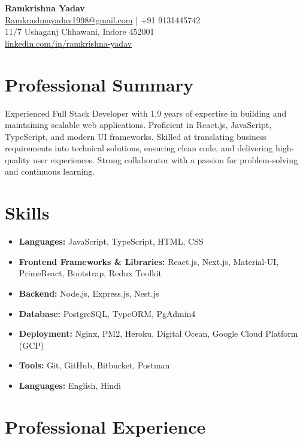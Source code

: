 \documentclass[a4paper,11pt]{article}
\begin{document}
\begin{center}
    \Huge \textbf{Ramkrishna Yadav} \\
    \vspace{2mm}
    \normalsize \href{mailto:Ramkrashnayadav1998@gmail.com}{Ramkrashnayadav1998@gmail.com} \hspace{5mm} | \hspace{5mm} +91 9131445742 \\
    \normalsize 11/7 Ushaganj Chhawani, Indore 452001 \\
    \href{https://linkedin.com/in/ramkrishna-yadav}{linkedin.com/in/ramkrishna-yadav}
\end{center}

\section*{Professional Summary}
Experienced Full Stack Developer with 1.9 years of expertise in building and maintaining scalable web applications. Proficient in React.js, JavaScript, TypeScript, and modern UI frameworks. Skilled at translating business requirements into technical solutions, ensuring clean code, and delivering high-quality user experiences. Strong collaborator with a passion for problem-solving and continuous learning.

\section*{Skills}
\begin{itemize}[leftmargin=*]
    \item \textbf{Languages:} JavaScript, TypeScript, HTML, CSS
    \item \textbf{Frontend Frameworks \& Libraries:} React.js, Next.js, Material-UI, PrimeReact, Bootstrap, Redux Toolkit
    \item \textbf{Backend:} Node.js, Express.js, Nest.js 
    \item \textbf{Database:} PostgreSQL, TypeORM, PgAdmin4
    \item \textbf{Deployment:} Nginx, PM2, Heroku, Digital Ocean, Google Cloud Platform (GCP)
    \item \textbf{Tools:} Git, GitHub, Bitbucket, Postman
    \item \textbf{Languages:} English, Hindi
\end{itemize}


\section*{Professional Experience}
\end{document}
